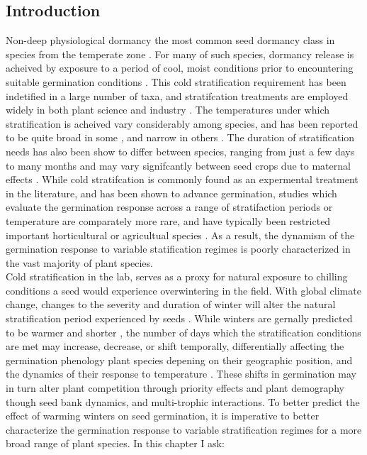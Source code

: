 \documentclass{article}\usepackage[]{graphicx}\usepackage[]{color}
\begin{document}
\subsection{Introduction}
Non-deep physiological dormancy the most common seed dormancy class in species from the temperate zone \citep{Finch-Savage_2006}. For many of such species, dormancy release is acheived by exposure to a period of cool, moist conditions prior to encountering suitable germination conditions \citep{}. This cold stratification requirement has been indetified in a large number of taxa, and stratifcation treatments are employed widely in both plant science and industry \citep{Hartmann_2011}. The temperatures under which stratification is acheived vary considerably among species, and has been reported to be quite broad in some \citep{Pritchard_1999,Vleeshouwers_2001}, and narrow in others \citep{WASHITAN_1988}. The duration of stratification needs has also been show to differ between species, ranging from just a few days \citpe*{} to many months \citep{} and may vary signifcantly between seed crops due to maternal effects  \citep{}. While cold stratifcation is commonly found as an expermental treatment in the literature, and has been shown to advance germination, studies which evaluate the germination response across a range of stratifaction periods or temperature are comparately more rare, and have typically been restricted important horticultural or agricultual species \citep{}. As a result, the dynamism of the germination response to variable statification regimes is poorly characterized in the vast majority of plant species.\\
\indent Cold stratification in the lab, serves as a proxy for natural exposure to chilling conditions a seed would experience overwintering in the field. With global climate change, changes to the severity and duration of winter will alter the natural stratification period experienced by seeds \citep{}. While winters are gernally predicted to be warmer and shorter \citep{IPCC}, the number of days which the stratification conditions are met may increase, decrease, or shift temporally, differentially affecting the germination phenology plant species depening on their geographic position, and the dynamics of their response to temperature \citep{Walck_2011}. These shifts in germination may in turn alter plant competition through priority effects \citep{} and plant demography though seed bank dynamics, and multi-trophic interactions.
\indent To better predict the effect of warming winters on seed germination, it is imperative to better characterize the germination response to variable stratification regimes for a more broad range of plant species. In this chapter I ask:
\end{document}
